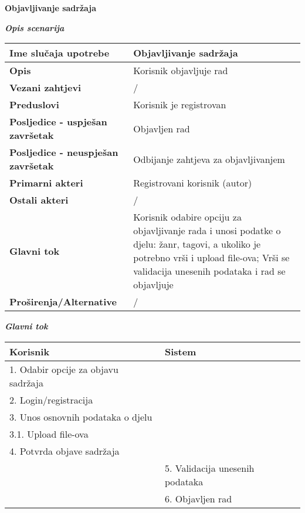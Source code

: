 \documentclass[12pt, a4paper]{report}
\begin{document}
\begin{flushleft}
{\large\textbf{Objavljivanje sadržaja}}  \newline

\textbf{\textit{Opis scenarija}} \\
\begin{tabular}{|m{7cm}|m{7cm}|} 
 \hline
 \textbf{Ime slučaja upotrebe} & Objavljivanje sadržaja \\ 
 \hline
 \textbf{Opis} & Korisnik objavljuje rad \\ 
 \hline
 \textbf{Vezani zahtjevi} & / \\ 
 \hline
 \textbf{Preduslovi} & Korisnik je registrovan \\ 
 \hline
 \textbf{Posljedice - uspješan završetak} & Objavljen rad \\ 
 \hline
 \textbf{Posljedice - neuspješan završetak} & Odbijanje zahtjeva za objavljivanjem \\ 
 \hline
 \textbf{Primarni akteri} & Registrovani korisnik (autor) \\ 
 \hline
 \textbf{Ostali akteri} & / \\ 
 \hline
 \textbf{Glavni tok} & Korisnik odabire opciju za objavljivanje rada i unosi podatke o djelu: žanr, tagovi, a ukoliko je potrebno vrši i upload
file-ova; Vrši se validacija unesenih podataka i rad se objavljuje \\ 
 \hline
 \textbf{Proširenja/Alternative} & / \\ 
 \hline
\end{tabular} \newpage

\textbf{\textit{Glavni tok}}
\begin{tabular}{|m{7cm}|m{7cm}|}
\hline
\textbf{Korisnik} & \textbf{Sistem} \\
\hline
1. Odabir opcije za objavu sadržaja &  \\
\hline
2. Login/registracija &  \\
\hline
3. Unos osnovnih podataka o djelu &  \\
\hline
3.1. Upload file-ova &  \\
\hline
4. Potvrda objave sadržaja &  \\
\hline
 & 5. Validacija unesenih podataka \\
\hline
 & 6. Objavljen rad \\
\hline
\end{tabular} \newline \newline


\end{flushleft}
\end{document}
